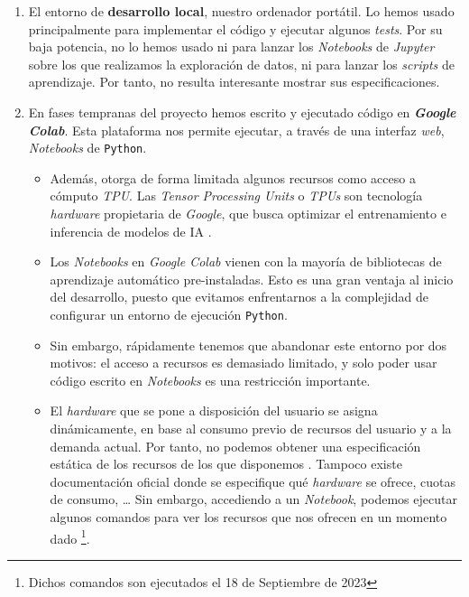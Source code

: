 \begin{enumerate}
	\item El entorno de \textbf{desarrollo local}, nuestro ordenador portátil. Lo hemos usado principalmente para implementar el código y ejecutar algunos \textit{tests}. Por su baja potencia, no lo hemos usado ni para lanzar los \textit{Notebooks} de \textit{Jupyter} sobre los que realizamos la exploración de datos, ni para lanzar los \textit{scripts} de aprendizaje. Por tanto, no resulta interesante mostrar sus especificaciones.

	\item En fases tempranas del proyecto hemos escrito y ejecutado código en \textbf{\textit{Google Colab}}. Esta plataforma nos permite ejecutar, a través de una interfaz \textit{web}, \textit{Notebooks} de \lstinline{Python}.

	      \begin{itemize}
		      \item Además, otorga de forma limitada algunos recursos como acceso a cómputo \textit{TPU}. Las \textit{Tensor Processing Units} o \textit{TPUs} son tecnología \textit{hardware} propietaria de \textit{Google}, que busca optimizar el entrenamiento e inferencia de modelos de IA \cite{informatica:google_tpu}.

		      \item Los \textit{Notebooks} en \textit{Google Colab} vienen con la mayoría de bibliotecas de aprendizaje automático pre-instaladas. Esto es una gran ventaja al inicio del desarrollo, puesto que evitamos enfrentarnos a la complejidad de configurar un entorno de ejecución \lstinline{Python}.

		      \item Sin embargo, rápidamente tenemos que abandonar este entorno por dos motivos: el acceso a recursos es demasiado limitado, y solo poder usar código escrito en \textit{Notebooks} es una restricción importante.

		      \item El \textit{hardware} que se pone a disposición del usuario se asigna dinámicamente, en base al consumo previo de recursos del usuario y a la demanda actual. Por tanto, no podemos obtener una especificación estática de los recursos de los que disponemos \cite{informatica:google_colab_faq}. Tampoco existe documentación oficial donde se especifique qué \textit{hardware} se ofrece, cuotas de consumo, \ldots\; Sin embargo, accediendo a un \textit{Notebook}, podemos ejecutar algunos comandos para ver los recursos que nos ofrecen en un momento dado \footnote{Dichos comandos son ejecutados el 18 de Septiembre de 2023}.


\end{itemize}
\end{enumerate}
